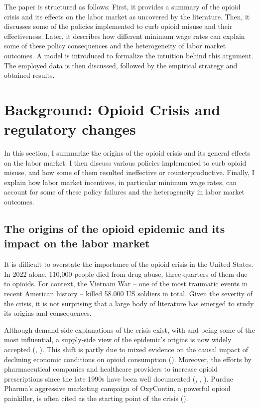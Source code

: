 \documentclass[12pt,a4paper]{article}
\begin{document}
The paper is structured as follows:
First, it provides a summary of the opioid crisis and its effects on the labor market as uncovered by the literature.
Then, it discusses some of the policies implemented to curb opioid misuse and their effectiveness.
Later, it describes how different minimum wage rates can explain some of these policy consequences and the heterogeneity of labor market outcomes. 
A model is introduced to formalize the intuition behind this argument.
The employed data is then discussed, followed by the empirical strategy and obtained results.

\section*{Background: Opioid Crisis and regulatory changes}

In this section, I summarize the origins of the opioid crisis and its general effects on the labor market.
I then discuss various policies implemented to curb opioid misuse, and how some of them resulted ineffective or counterproductive. 
Finally, I explain how labor market incentives, in particular minimum wage rates, can account for some of these policy failures and the heterogeneity in labor market outcomes.

\subsection*{The origins of the opioid epidemic and its impact on the labor market}

It is difficult to overstate the importance of the opioid crisis in the United States. 
In 2022 alone, 110,000 people died from drug abuse, three-quarters of them due to opioids.
For context, the Vietnam War -- one of the most traumatic events in recent American history -- killed 58.000 US soldiers in total.
Given the severity of the crisis, it is not surprising that a large body of literature has emerged to study its origins and consequences.

Although demand-side explanations of the crisis exist, with \textcite{Deaton2017} and \textcite{Deaton2015} being some of the most influential, a supply-side view of the epidemic's origins is now widely accepted (\cite{Eichmeyer2022}, \cite{Ruhm2018}). 
This shift is partly due to mixed evidence on the causal impact of declining economic conditions on opioid consumption (\cite{Currie2018}).
Moreover, the efforts by pharmaceutical companies and healthcare providers to increase opioid prescriptions since the late 1990s have been well documented (\cite{Alpert2019}, \cite{Kolodny2015}, \cite{VanZee2008}).
Purdue Pharma's aggressive marketing campaign of OxyContin, a powerful opioid painkiller, is often cited as the starting point of the crisis (\cite{Chow2019}).
\end{document}

